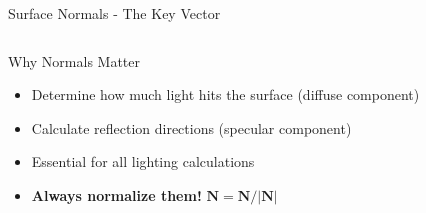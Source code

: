 \begin{frame}{Surface Normals - The Key Vector}
\begin{columns}
\begin{column}{0.4\textwidth}
    \end{column}
  \end{columns}

  \vspace{0.3cm}
  \pause
  \begin{conceptbox}{Why Normals Matter}
    \begin{itemize}
      \item Determine how much light hits the surface (diffuse component)
      \item Calculate reflection directions (specular component)
      \item Essential for all lighting calculations
      \item \textbf{Always normalize them!} $\mathbf{N} = \mathbf{N}/|\mathbf{N}|$
    \end{itemize}
  \end{conceptbox}
\end{frame}


